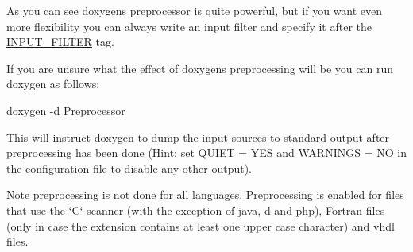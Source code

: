 As you can see doxygen\textquotesingle{}s preprocessor is quite powerful, but if you want even more flexibility you can always write an input filter and specify it after the \mbox{\hyperlink{config_cfg_input_filter}{I\+N\+P\+U\+T\+\_\+\+F\+I\+L\+T\+ER}} tag.

If you are unsure what the effect of doxygen\textquotesingle{}s preprocessing will be you can run doxygen as follows\+: \begin{DoxyVerb}  doxygen -d Preprocessor
\end{DoxyVerb}
 This will instruct doxygen to dump the input sources to standard output after preprocessing has been done (Hint\+: set {\ttfamily Q\+U\+I\+ET = Y\+ES} and {\ttfamily W\+A\+R\+N\+I\+N\+GS = NO} in the configuration file to disable any other output).

Note preprocessing is not done for all languages. Preprocessing is enabled for files that use the \char`\"{}\+C\char`\"{} scanner (with the exception of \textquotesingle{}java\textquotesingle{}, \textquotesingle{}d\textquotesingle{} and \textquotesingle{}php\textquotesingle{}), Fortran files (only in case the extension contains at least one upper case character) and vhdl files.

 